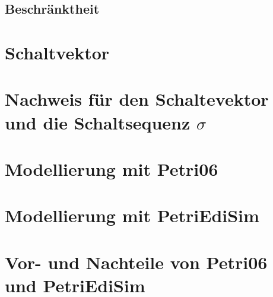\documentclass{article}
\begin{document}
		\subsection*{Beschränktheit}
	\section{Schaltvektor}
	\section{Nachweis für den Schaltevektor und die Schaltsequenz $\sigma$}
	\section{Modellierung mit Petri06}
	\section{Modellierung mit PetriEdiSim}
	\section{Vor- und Nachteile von Petri06 und PetriEdiSim}
	
\end{document}
